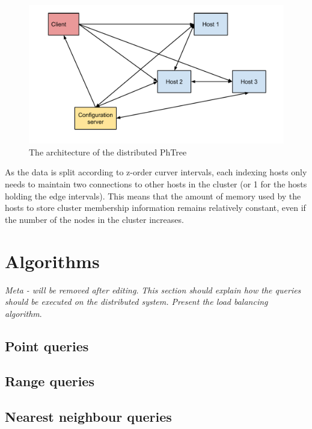 \documentclass[11pt,a4paper]{globis-book}
\begin{document}
\begin{figure}[h]
    \centering 
    \includegraphics[scale=0.7]{images/architecture}
    \caption{The architecture of the distributed PhTree}
    \label{fig:architecture}
\end{figure}

As the data is split according to z-order curver intervals, each indexing hosts only needs to maintain two connections to other hosts in the cluster (or 1 for the hosts holding the edge intervals). This means that the amount of memory used by the hosts to store cluster membership information remains relatively constant, even if the number of the nodes in the cluster increases. 

\section{Algorithms}
\label{sec:distindex-algorithms}

\textit{Meta - will be removed after editing.}
\textit{This section should explain how the queries should be executed on the distributed system. Present the load balancing algorithm}.

\subsection{Point queries}

\subsection{Range queries}

\subsection{Nearest neighbour queries}
\end{document}

